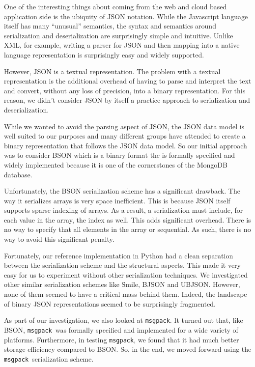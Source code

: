 \documentclass[11pt,a4paper,twocolumn]{article}
\newcommand{\msgpack}{\texttt{msgpack}}
\begin{document}
One of the interesting things about coming from the web and cloud
based application side is the ubiquity of JSON notation.  While the
Javascript language itself has many ``unusual'' semantics, the syntax
and semantics around serialization and deserialization are
surprisingly simple and intuitive.  Unlike XML, for example, writing a
parser for JSON and then mapping into a native language representation
is surprisingly easy and widely supported.

However, JSON is a textual representation.  The problem with a textual
representation is the additional overhead of having to parse and
interpret the text and convert, without any loss of precision, into a
binary representation.  For this reason, we didn't consider JSON by
itself a practice approach to serialization and deserialization.

While we wanted to avoid the parsing aspect of JSON, the JSON data
model \cite{JSON} is well suited to our purposes and many different
groups have attended to create a binary representation that follows
the JSON data model.  So our initial approach was to consider BSON
\cite{BSON} which is a binary format the is formally specified and
widely implemented because it is one of the cornerstones of the
MongoDB database\cite{MongoDB}.

Unfortunately, the BSON serialization scheme has a significant
drawback.  The way it serializes arrays is very space inefficient.
This is because JSON itself supports sparse indexing of arrays.  As a
result, a serialization must include, for each value in the array, the
index as well.  This adds significant overhead.  There is no way to
specify that all elements in the array or sequential.  As such, there
is no way to avoid this significant penalty.

Fortunately, our reference implementation in Python\cite{pyRecon} had
a clean separation between the serialization scheme and the structural
aspects.  This made it very easy for us to experiment without other
serialization techniques.  We investigated other similar serialization
schemes like Smile\cite{Smile}, BJSON\cite{BJSON} and
UBJSON\cite{UBJSON}.  However, none of them seemed to have a critical
mass behind them.  Indeed, the landscape of binary JSON
representations seemed to be surprisingly fragmented.

As part of our investigation, we also looked at \msgpack.  It turned
out that, like BSON, \msgpack\ was formally specified and implemented
for a wide variety of platforms\cite{MsgPack}.  Furthermore, in
testing \msgpack, we found that it had much better storage efficiency
compared to BSON.  So, in the end, we moved forward using the
\msgpack\ serialization scheme.
\end{document}
